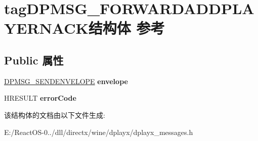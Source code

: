 \hypertarget{structtag_d_p_m_s_g___f_o_r_w_a_r_d_a_d_d_p_l_a_y_e_r_n_a_c_k}{}\section{tag\+D\+P\+M\+S\+G\+\_\+\+F\+O\+R\+W\+A\+R\+D\+A\+D\+D\+P\+L\+A\+Y\+E\+R\+N\+A\+C\+K结构体 参考}
\label{structtag_d_p_m_s_g___f_o_r_w_a_r_d_a_d_d_p_l_a_y_e_r_n_a_c_k}
\subsection*{Public 属性}
\begin{DoxyCompactItemize}
\item 
\mbox{\label{structtag_d_p_m_s_g___f_o_r_w_a_r_d_a_d_d_p_l_a_y_e_r_n_a_c_k_a883e145252f5bc54c235f32b946bb5be}} 
\hyperlink{structtag_d_p_m_s_g___s_e_n_d_e_n_v_e_l_o_p_e}{D\+P\+M\+S\+G\+\_\+\+S\+E\+N\+D\+E\+N\+V\+E\+L\+O\+PE} {\bfseries envelope}
\item 
\mbox{\label{structtag_d_p_m_s_g___f_o_r_w_a_r_d_a_d_d_p_l_a_y_e_r_n_a_c_k_acb0698d7741506b53913e5c67c6e2c23}} 
H\+R\+E\+S\+U\+LT {\bfseries error\+Code}
\end{DoxyCompactItemize}


该结构体的文档由以下文件生成\+:\begin{DoxyCompactItemize}
\item 
E\+:/\+React\+O\+S-\/0../dll/directx/wine/dplayx/dplayx\+\_\+messages.\+h\end{DoxyCompactItemize}
